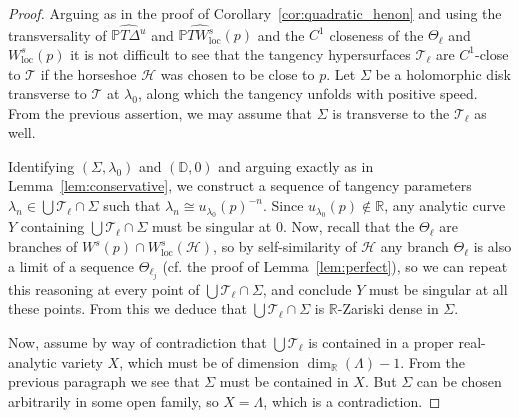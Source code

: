 \documentclass[11pt, oneside]{amsart}
\newcommand{\R}{\mathbb{R}}
\newcommand{\D}{\mathbb{D}}
\renewcommand{\P}{\mathbb{P}}
\newcommand{\lo}{{\lambda_0}}
\newcommand{\loc}{{\mathrm{loc}}}
\newcommand{\La}{\Lambda}
\theoremstyle{remark}
\theoremstyle{definition}
\theoremstyle{theorem}
\newcommand{\commentaire}[1]{}
\begin{document}
\begin{proof}\commentaire{proof completely rewritten, cf Minor comment \#11}
 Arguing as in the proof of Corollary~\ref{cor:quadratic_henon} 
and using the transversality of $\widehat{\P T\Delta^u}$ and $\widehat{\P TW^s_\loc}(p)$ and the $C^1$ closeness  of the $\Theta_\ell$ and $W^s_\loc(p)$ 
it is not difficult to see that  the tangency hypersurfaces 
$\mathcal T_\ell$ are $C^1$-close to $\mathcal T$ if the horseshoe $\mathcal H$ was chosen to be 
 close to $p$. 
Let $\Sigma$ be a   holomorphic disk transverse to $\mathcal T$ at $\lo$, along which the tangency unfolds with positive speed. From  the previous assertion, 
we may assume that  $\Sigma$ is transverse to the $\mathcal T_\ell$ as well. 

Identifying 
$(\Sigma, \lo)$ and $(\D, 0)$ and arguing exactly as in Lemma~\ref{lem:conservative}, we construct a sequence of tangency parameters $\lambda_n\in \bigcup \mathcal T_\ell\cap \Sigma$ such that 
$\lambda_n\cong u_{\lo}(p)^{-n}$. Since $u_{\lo}(p)\notin\R$, any analytic curve $Y$ containing 
$\bigcup \mathcal T_\ell\cap \Sigma$ must be singular at 0. Now, recall that the $\Theta_\ell$ are branches of 
$W^s(p)\cap W^s_\loc(\mathcal H)$, so by self-similarity of  $\mathcal H$ any branch $\Theta_\ell$ is also a limit of a sequence $\Theta_{\ell_j}$ (cf. the proof of Lemma~\ref{lem:perfect}), so we can repeat this reasoning at every point of $\bigcup \mathcal T_\ell\cap \Sigma$, and conclude $Y$ must be singular at all these points. From this we deduce that $\bigcup \mathcal T_\ell\cap \Sigma$ is $\R$-Zariski dense in $\Sigma$. 

Now, assume by way of contradiction that $\bigcup \mathcal T_\ell$ is contained in a proper 
real-analytic variety $X$, which must be of dimension $\dim_\R(\La)-1$.
From the previous paragraph we see that  
$\Sigma$ must be contained in $X$. 
But $\Sigma$  can be chosen arbitrarily in some open family, so $X=\Lambda$, 
which is a contradiction.  
\end{proof}
\end{document}
